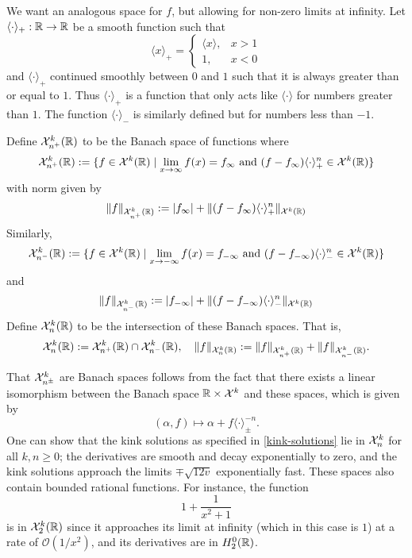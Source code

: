 We want an analogous space for \(f\), but allowing for non-zero limits at infinity. Let \(\langle\cdot \rangle_+ :\mathbb{R} \to \mathbb{R}\) be a smooth function such that
\begin{equation*}
	\langle x \rangle_+ = \begin{cases} \langle x \rangle, & x>1 \\ 1, & x<0\end{cases}
\end{equation*}
and \(\langle \cdot \rangle_+\) continued smoothly between \(0\) and \(1\) such that it is always greater than or equal to \(1\). Thus \(\langle \cdot \rangle_+\) is a function that only acts like \(\langle \cdot \rangle\) for numbers greater than \(1\). The function \(\langle \cdot \rangle_-\) is similarly defined but for numbers less than \(-1\).

\begin{defn}
	Define \(\mathcal{X}^k_{n^+} (\mathbb{R})\) to be the Banach space of functions where 
	\begin{equation*}
		\mathcal{X}^k_{n^+} (\mathbb{R}) := \{ f \in \mathcal{X}^k(\mathbb{R}) \mid \lim_{x\to\infty} f(x) = f_\infty\text{ and } (f-f_\infty)\langle\cdot\rangle_+^n \in \mathcal{X}^k(\mathbb{R})\}
	\end{equation*}
	with norm given by
	\begin{equation*}
		\| f \|_{\mathcal{X}^k_{n^+}(\mathbb{R})} := |f_\infty| + \|(f-f_\infty) \langle \cdot \rangle_+^n \|_{\mathcal X^k(\mathbb{R})}
	\end{equation*}
	Similarly, 
	\begin{equation*}
		\mathcal{X}^k_{n^-} (\mathbb{R}) := \{ f \in \mathcal{X}^k(\mathbb{R}) \mid \lim_{x\to-\infty} f(x) = f_{-\infty}\text{ and } (f-f_{-\infty})\langle\cdot\rangle_-^n \in \mathcal{X}^k(\mathbb{R})\}
	\end{equation*}
	and 
	\begin{equation*}
		\| f \|_{\mathcal{X}^k_{n^-}(\mathbb{R})} := |f_{-\infty}| + \|(f-f_{-\infty}) \langle \cdot \rangle_-^n \|_{\mathcal X^k(\mathbb{R})}
	\end{equation*}
	Define \(\mathcal{X}^k_n(\mathbb{R})\) to be the intersection of these Banach spaces. That is,
	\begin{equation*}
		\mathcal{X}^k_n(\mathbb{R}) := \mathcal{X}^k_{n^+} (\mathbb{R}) \cap \mathcal{X}^k_{n^-} (\mathbb{R}), \quad \| f \|_{\mathcal{X}^k_{n} (\mathbb{R})} := \|f\|_{\mathcal{X}^k_{n^+} (\mathbb{R})} + \|f\|_{\mathcal{X}^k_{n^-} (\mathbb{R})}.
	\end{equation*}
\end{defn}
	That \(\mathcal{X}^k_{n^\pm}\) are Banach spaces follows from the fact that there exists a linear isomorphism between the Banach space \(\mathbb{R}\times \mathcal{X}^k\) and these spaces, which is given by
\begin{equation*}
	(\alpha, f) \mapsto \alpha + f \langle \cdot \rangle^{-n}_{\pm}.
\end{equation*}
One can show that the kink solutions as specified in \cref{kink-solutions} lie in \(\mathcal{X}^k_n\) for all \(k,n\geq 0\); the derivatives are smooth and decay exponentially to zero, and the kink solutions approach the limits \(\mp\sqrt{12v}\) exponentially fast. These spaces also contain bounded rational functions. For instance, the function \[1 + \frac 1 {x^2 +1}\] is in \(\mathcal{X}^k_2(\mathbb{R})\) since it approaches its limit at infinity (which in this case is \(1\)) at a rate of \(\mathcal O(1/x^2)\), and its derivatives are in \(H^0_2(\mathbb{R})\).

